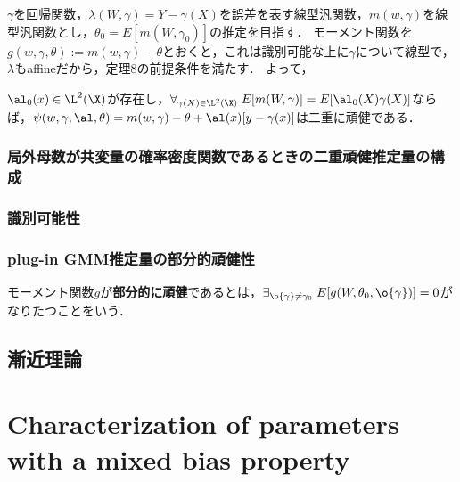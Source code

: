 \documentclass[uplatex,dvipdfmx]{jsreport}
\begin{document}
\begin{example}
    $\gamma$を回帰関数，$\lambda(W,\gamma)=Y-\gamma(X)$を誤差を表す線型汎関数，$m(w,\gamma)$を線型汎関数とし，$\theta_0=E[m(W,\gamma_0)]$の推定を目指す．
    モーメント関数を$g(w,\gamma,\theta):=m(w,\gamma)-\theta$とおくと，これは識別可能な上に$\gamma$について線型で，
    $\lambda$もaffineだから，定理8の前提条件を満たす．
    よって，
    \begin{corollary}
        $\al_0(x)\in\L^2(\X)$が存在し，$\forall_{\gamma(X)\in\L^2(\X)}\;E[m(W,\gamma)]=E[\al_0(X)\gamma(X)]$ならば，$\psi(w,\gamma,\al,\theta)=m(w,\gamma)-\theta+\al(x)[y-\gamma(x)]$は二重に頑健である．
    \end{corollary}
\end{example}

\subsubsection{局外母数が共変量の確率密度関数であるときの二重頑健推定量の構成}

\subsubsection{識別可能性}

\begin{theorem}
    
\end{theorem}

\subsubsection{plug-in GMM推定量の部分的頑健性}

\begin{definition}
    モーメント関数$g$が\textbf{部分的に頑健}であるとは，$\exists_{\o{\gamma}\ne\gamma_0}\;E[g(W,\theta_0,\o{\gamma})]=0$がなりたつことをいう．
\end{definition}

\subsection{漸近理論}

\section{Characterization of parameters with a mixed bias property}
\end{document}
